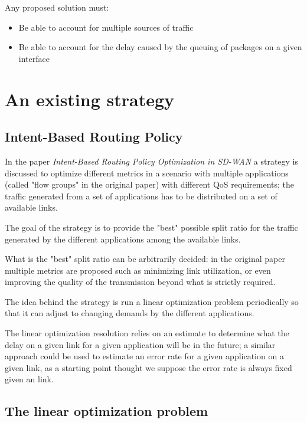 	Any proposed solution must: 
	
	\begin{itemize}
		\item Be able to account for multiple sources of traffic
		\item Be able to account for the delay caused by the queuing of packages on a given interface
	\end{itemize}
	
	
	
	\section{An existing strategy}
	
	
	\subsection{Intent-Based Routing Policy}
	

	In the paper \textit{Intent-Based Routing Policy Optimization in SD-WAN} \cite{intent_based_routing} a strategy is discussed to optimize different metrics in a scenario with multiple applications (called "flow groups" in the original paper) with different QoS requirements; the traffic generated from a set of applications has to be distributed on a set of available links.
	
	The goal of the strategy is to provide the "best" possible split ratio for the traffic generated by the different applications among the available links.
	
	What is the "best" split ratio can be arbitrarily decided: in the original paper multiple metrics are proposed such as minimizing link utilization, or even improving the quality of the transmission beyond what is strictly required.
	
	The idea behind the strategy is run a linear optimization problem periodically so that it can adjust to changing demands by the different applications.
	
	The linear optimization resolution relies on an estimate to determine what the delay on a given link for a given application will be in the future; a similar approach could be used to estimate an error rate for a given application on a given link, as a starting point thought we suppose the error rate is always fixed given an link.
	
	
	\subsection{The linear optimization problem}
	
